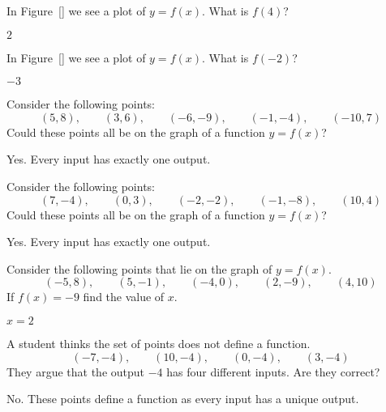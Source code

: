 \begin{exercises}

\begin{exercise} 
In Figure~\ref{} we see a plot of $y=f(x)$. What is $f(4)$?    %
\begin{answer}
$2$
\end{answer}
\end{exercise}


\begin{exercise} 
In Figure~\ref{} we see a plot of $y=f(x)$. What is $f(-2)$?  %
\begin{answer}
$-3$
\end{answer}
\end{exercise}


\begin{exercise} Consider the following points:
\[
(5,8),\qquad (3,6), \qquad(-6,-9), \qquad(-1,-4), \qquad(-10,7)
\]
Could these points all be on the graph of a function $y =f(x)$?
\begin{answer}
Yes.  Every input has exactly one output.
\end{answer}
\end{exercise}


\begin{exercise} Consider the following points:
\[
(7,-4),\qquad (0,3), \qquad(-2,-2), \qquad(-1,-8), \qquad(10,4)
\]
Could these points all be on the graph of a function $y =f(x)$?
\begin{answer}
Yes.  Every input has exactly one output.
\end{answer}
\end{exercise}


\begin{exercise} Consider the following points that lie on the graph of $y =f(x)$.
\[
(-5,8),\qquad (5,-1), \qquad(-4,0), \qquad(2,-9), \qquad(4,10)
\]
If $f(x)=-9$ find the value of $x$.
\begin{answer}
$x=2$
\end{answer}
\end{exercise}

\begin{exercise} A student thinks the set of points does not define a function.
\[
(-7,-4),\qquad (10,-4), \qquad(0,-4), \qquad(3,-4)
\]
They argue that the output $-4$ has four different inputs.  Are they
correct?
\begin{answer}
No.  These points define a function as every input has a unique output.
\end{answer}
\end{exercise}


\end{exercises}

